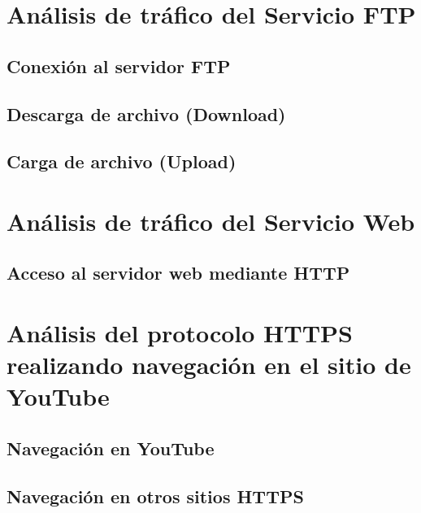 \documentclass[10pt]{article}
\begin{document}
\renewcommand{\thesection}{8.\arabic{section}}
\section{Análisis de tráfico del Servicio FTP}
\subsection{Conexión al servidor FTP}
\subsection{Descarga de archivo (Download)}
\subsection{Carga de archivo (Upload)}

\renewcommand{\thesection}{8.\arabic{section}}
\section{Análisis de tráfico del Servicio Web}
\subsection{Acceso al servidor web mediante HTTP}

\renewcommand{\thesection}{8.\arabic{section}}
\section{Análisis del protocolo HTTPS realizando navegación en el sitio de YouTube}
\subsection{Navegación en YouTube}
\subsection{Navegación en otros sitios HTTPS}
\end{document}
